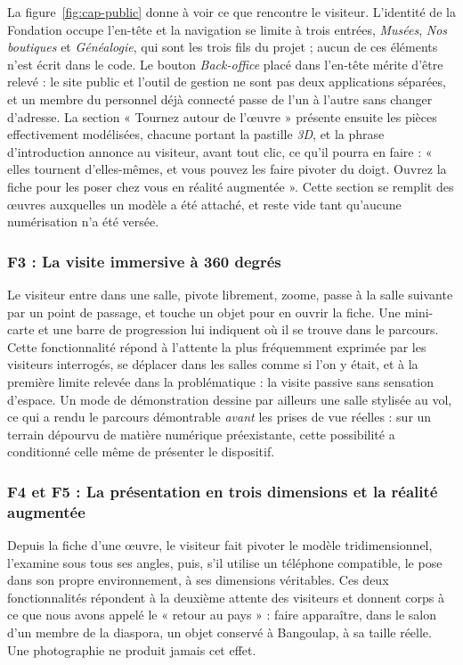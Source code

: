 La figure~\ref{fig:cap-public} donne à voir ce que rencontre le visiteur.
L'identité de la Fondation occupe l'en-tête et la navigation se limite à trois
entrées, \emph{Musées}, \emph{Nos boutiques} et \emph{Généalogie}, qui sont les
trois fils du projet ; aucun de ces éléments n'est écrit dans le code. Le bouton
\emph{Back-office} placé dans l'en-tête mérite d'être relevé : le site public et
l'outil de gestion ne sont pas deux applications séparées, et un membre du
personnel déjà connecté passe de l'un à l'autre sans changer d'adresse. La
section « Tournez autour de l'œuvre » présente ensuite les pièces effectivement
modélisées, chacune portant la pastille \emph{3D}, et la phrase d'introduction
annonce au visiteur, avant tout clic, ce qu'il pourra en faire : « elles
tournent d'elles-mêmes, et vous pouvez les faire pivoter du doigt. Ouvrez la
fiche pour les poser chez vous en réalité augmentée ». Cette section se remplit
des œuvres auxquelles un modèle a été attaché, et reste vide tant qu'aucune
numérisation n'a été versée.

\subsubsection{F3 : La visite immersive à 360 degrés}

Le visiteur entre dans une salle, pivote librement, zoome, passe à la salle
suivante par un point de passage, et touche un objet pour en ouvrir la fiche.
Une mini-carte et une barre de progression lui indiquent où il se trouve dans le
parcours. Cette fonctionnalité répond à l'attente la plus fréquemment exprimée
par les visiteurs interrogés, se déplacer dans les salles comme si l'on y était,
et à la première limite relevée dans la problématique : la visite passive sans
sensation d'espace. Un mode de démonstration dessine par ailleurs une salle
stylisée au vol, ce qui a rendu le parcours démontrable \emph{avant} les prises
de vue réelles : sur un terrain dépourvu de matière numérique préexistante,
cette possibilité a conditionné celle même de présenter le dispositif.

\subsubsection{F4 et F5 : La présentation en trois dimensions et la réalité augmentée}

Depuis la fiche d'une œuvre, le visiteur fait pivoter le modèle
tridimensionnel, l'examine sous tous ses angles, puis, s'il utilise un téléphone
compatible, le pose dans son propre environnement, à ses dimensions véritables.
Ces deux fonctionnalités répondent à la deuxième attente des visiteurs et
donnent corps à ce que nous avons appelé le « retour au pays » : faire
apparaître, dans le salon d'un membre de la diaspora, un objet conservé à
Bangoulap, à sa taille réelle. Une photographie ne produit jamais cet effet.

